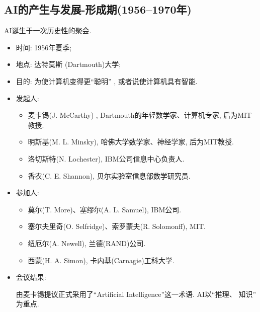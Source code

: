 \subsection{AI的产生与发展-形成期(1956--1970年)}
AI诞生于一次历史性的聚会.
\begin{itemize}
\item  时间: 1956年夏季;
\item  地点: 达特莫斯 (Dartmouth)大学;
\item  目的: 为使计算机变得更“聪明” , 或者说使计算机具有智能.

\item  发起人:
      \begin{itemize}
          \item  麦卡锡(J. McCarthy) , Dartmouth的年轻数学家、计算机专家, 后为MIT教授.
          \item  明斯基(M. L. Minsky), 哈佛大学数学家、神经学家, 后为MIT教授.
          \item  洛切斯特(N. Lochester),  IBM公司信息中心负责人.
          \item  香农(C. E. Shannon), 贝尔实验室信息部数学研究员.
      \end{itemize}
\item  参加人:
      \begin{itemize}
          \item  莫尔(T. More)、塞缪尔(A. L. Samuel),  IBM公司.
          \item 塞尔夫里奇(O. Selfridge)、索罗蒙夫(R. Solomonff), MIT.
          \item 纽厄尔(A. Newell), 兰德(RAND)公司.
          \item 西蒙(H. A. Simon), 卡内基(Carnagie)工科大学.
      \end{itemize}
\item  会议结果:

     由麦卡锡提议正式采用了“Artificial Intelligence”这一术语. AI以“推理、 知识” 为重点.
\end{itemize}


